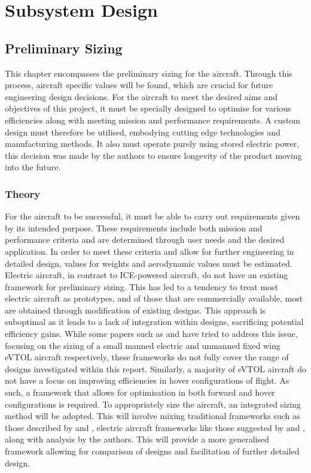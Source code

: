 \section{Subsystem Design}

\subsection{Preliminary Sizing}
\label{sec:prelim_sizing}
This chapter encompasses the preliminary sizing for the aircraft. Through this process, aircraft specific values will be found, which are crucial for future engineering design decisions. For the aircraft to meet the desired aims and objectives of this project, it must be specially designed to optimise for various efficiencies along with meeting mission and performance requirements. A custom design must therefore be utilised, embodying cutting edge technologies and manufacturing methods. It also must operate purely using stored electric power, this decision was made by the authors to ensure longevity of the product moving into the future. 

\subsubsection{Theory}
For the aircraft to be successful, it must be able to carry out requirements given by its intended purpose. These requirements include both mission and performance criteria and are determined through user needs and the desired application. In order to meet these criteria and allow for further engineering in detailed design, values for weights and aerodynamic values must be estimated. Electric aircraft, in contrast to ICE-powered aircraft, do not have an existing framework for preliminary sizing. This has led to a tendency to treat most electric aircraft as prototypes, and of those that are commercially available, most are obtained through modification of existing designs. This approach is suboptimal as it leads to a lack of integration within designs, sacrificing potential efficiency gains. While some papers such as \cite{RN3} and \cite{RN85} have tried to address this issue, focusing on the sizing of a small manned electric and unmanned fixed wing eVTOL aircraft respectively, these frameworks do not fully cover the range of designs investigated within this report. Similarly, a majority of eVTOL aircraft do not have a focus on improving efficiencies in hover configurations of flight. As such, a framework that allows for optimisation in both forward and hover configurations is required. To appropriately size the aircraft, an integrated sizing method will be adopted. This will involve mixing traditional frameworks such as those described by \cite{roskam1985airplane} and \cite{raymer1989aircraft}, electric aircraft frameworks like those suggested by \cite{RN3} and \cite{RN85}, along with analysis by the authors. This will provide a more generalised framework allowing for comparison of designs and facilitation of further detailed design.

